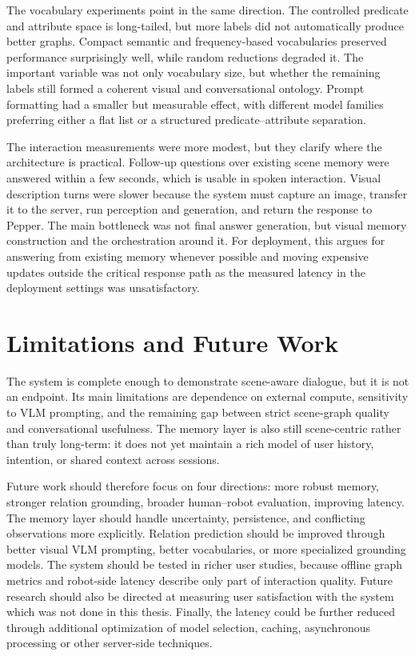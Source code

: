 The vocabulary experiments point in the same direction. The controlled predicate and attribute space is long-tailed, but more labels did not automatically produce better graphs. Compact semantic and frequency-based vocabularies preserved performance surprisingly well, while random reductions degraded it. The important variable was not only vocabulary size, but whether the remaining labels still formed a coherent visual and conversational ontology. Prompt formatting had a smaller but measurable effect, with different model families preferring either a flat list or a structured predicate--attribute separation.

The interaction measurements were more modest, but they clarify where the architecture is practical. Follow-up questions over existing scene memory were answered within a few seconds, which is usable in spoken interaction. Visual description turns were slower because the system must capture an image, transfer it to the server, run perception and generation, and return the response to Pepper. The main bottleneck was not final answer generation, but visual memory construction and the orchestration around it. For deployment, this argues for answering from existing memory whenever possible and moving expensive updates outside the critical response path as the measured latency in the deployment settings was unsatisfactory.

\section{Limitations and Future Work}
The system is complete enough to demonstrate scene-aware dialogue, but it is not an endpoint. Its main limitations are dependence on external compute, sensitivity to VLM prompting, and the remaining gap between strict scene-graph quality and conversational usefulness. The memory layer is also still scene-centric rather than truly long-term: it does not yet maintain a rich model of user history, intention, or shared context across sessions.

Future work should therefore focus on four directions: more robust memory, stronger relation grounding, broader human--robot evaluation, improving latency. The memory layer should handle uncertainty, persistence, and conflicting observations more explicitly. Relation prediction should be improved through better visual VLM prompting, better vocabularies, or more specialized grounding models. The system should be tested in richer user studies, because offline graph metrics and robot-side latency describe only part of interaction quality. Future research should also be directed at measuring user satisfaction with the system which was not done in this thesis. Finally, the latency could be further reduced through additional optimization of model selection, caching, asynchronous processing or other server-side techniques.


